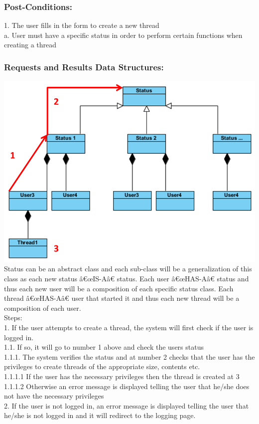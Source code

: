 \documentclass[a4paper,11pt]{article}
\begin{document}
\subsubsection*{Post-Conditions:}
1.	The user fills in the form to create a new thread\\
a.	User must have a specific status in order to perform certain functions when creating a thread
\subsubsection*{Requests and Results Data Structures:}
\includegraphics[width=\linewidth]{./Images/CRUDThread/Diagrams/1.png}
Status can be an abstract class and each sub-class will be a generalization of this class as each new status â€œIS-Aâ€ status.
Each user â€œHAS-Aâ€ status and thus each new user will be a composition of each specific status class.
Each thread â€œHAS-Aâ€ user that started it and thus each new thread will be a composition of each user.\\
Steps:\\
1.	If the user attempts to create a thread, the system will first check if the user is logged in.\\
1.1.	If so, it will go to number 1 above and check the users status\\
1.1.1.	The system verifies the status and at number 2 checks that the user has the privileges to create threads of the appropriate size, contents etc.\\
1.1.1.1	If the user has the necessary privileges then the thread is created at 3\\
1.1.1.2	Otherwise an error message is displayed telling the user that he/she does not have the necessary privileges \\
2.	If the user is not logged in, an error message is displayed telling the user that he/she is not logged in and it will redirect to the logging page.\\
\end{document}
